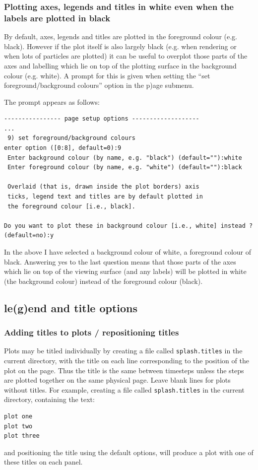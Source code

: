 \documentclass[a4paper,10pt]{article}
\begin{document}
\subsubsection{ Plotting axes, legends and titles in white even when the labels are plotted in black}
 By default, axes, legends and titles are plotted in the foreground colour (e.g. black). However if the plot itself is also largely black (e.g. when rendering or when lots of particles are plotted) it can be useful to overplot those parts of the axes and labelling which lie on top of the plotting surface in the background colour (e.g. white). A prompt for this is given when setting the ``set foreground/background colours'' option in the p)age submenu. 
 
 The prompt appears as follows:
\begin{verbatim}
---------------- page setup options -------------------
...
 9) set foreground/background colours 
enter option ([0:8], default=0):9
 Enter background colour (by name, e.g. "black") (default=""):white
 Enter foreground colour (by name, e.g. "white") (default=""):black

 Overlaid (that is, drawn inside the plot borders) axis 
 ticks, legend text and titles are by default plotted in 
 the foreground colour [i.e., black].

Do you want to plot these in background colour [i.e., white] instead ? (default=no):y
\end{verbatim}
 In the above I have selected a background colour of white, a foreground colour of black. Answering yes to the last question means that those parts of the axes which lie on top of the viewing surface (and any labels) will be plotted in white (the background colour) instead of the foreground colour (black). 
 
\subsection{le(g)end and title options}%

\subsubsection{ Adding titles to plots / repositioning titles}
\label{sec:title}
 Plots may be titled individually by creating a file called \verb+splash.titles+ in
the current directory, with the title on each line corresponding to the position
of the plot on the page. Thus the title is the same between timesteps unless the
steps are plotted together on the same physical page. Leave blank lines for
plots without titles. For example, creating a file called \verb+splash.titles+ in
the current directory, containing the text:
\begin{verbatim}
plot one
plot two
plot three
\end{verbatim}
and positioning the title using the default options, will produce a plot with one of these titles on each panel.
\end{document}
